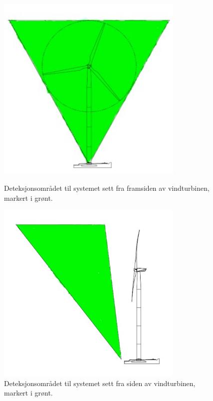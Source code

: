 \begin{figure}[!htbp]%
  \centering
  \begin{minipage}[b]{0.45\textwidth}
    \includegraphics[width=0.8\textwidth]{design/DeteksjonForan.jpg}
    \caption{Deteksjonsområdet til systemet sett fra framsiden av vindturbinen, markert i grønt. }
    \label{fig:TurbinForan}
  \end{minipage}
  \hfill
  \begin{minipage}[b]{0.45\textwidth}
    \includegraphics[width=0.8\textwidth]{design/DeteksjonSiden2.jpg}
    \caption{Deteksjonsområdet til systemet sett fra siden av vindturbinen, markert i grønt.}
    \label{fig:TurbinSiden}
  \end{minipage}
\end{figure}

